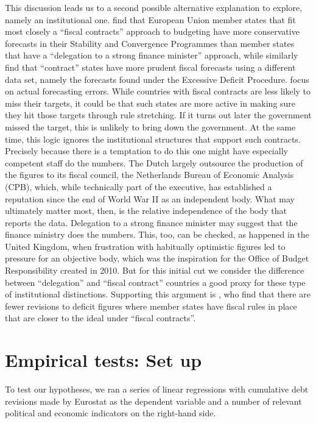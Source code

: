 \documentclass[]{article}
\begin{document}
This discussion leads us to a second possible alternative explanation to explore, namely an  institutional one.  \cite{hallerbergstrauch2009} find that European Union member states that fit most closely a ``fiscal contracts'' approach to budgeting have more conservative forecasts in their Stability and Convergence Programmes than member states that have a ``delegation to a strong finance minister'' approach, while \cite{PinaVenes2011} similarly find that ``contract'' states have more prudent fiscal forecasts using a different data set, namely the forecasts found under the Excessive Deficit Procedure. \cite{hallerbergstrauch2009} focus on actual forecasting errors. While countries with fiscal contracts are less likely to miss their targets, it could be that such states are more active in making sure they hit those targets through rule stretching.  If it turns out later the government missed the target, this is unlikely to bring down the government. At the same time, this logic ignores the institutional structures that support such contracts. Precisely because  there is a temptation to do this one might have especially competent staff do the numbers. The Dutch largely outsource the production of the figures to its fiscal council, the Netherlands Bureau of Economic Analysis (CPB), which, while technically part of the executive, has established a reputation since the end of World War II as an independent body. What may ultimately matter most, then, is the relative independence of the body that reports the data. Delegation to a strong finance minister may suggest that the finance ministry does the numbers. This, too, can be checked, as happened in the United Kingdom, when frustration with habitually optimistic figures led to pressure for an objective body, which was the inspiration for the Office of Budget Responsibility created in 2010. But for this initial cut we consider the difference between ``delegation'' and ``fiscal contract'' countries a good proxy for these type of institutional distinctions. Supporting this argument is \cite{DeCastro2013}, who find that there are fewer revisions to deficit figures where member states have fiscal rules in place that are closer to the ideal under ``fiscal contracts''.

\section{Empirical tests: Set up}

To test our hypotheses, we ran a series of linear regressions with cumulative debt revisions made by Eurostat as the dependent variable and a number of relevant political and economic indicators on the right-hand side.
\end{document}
